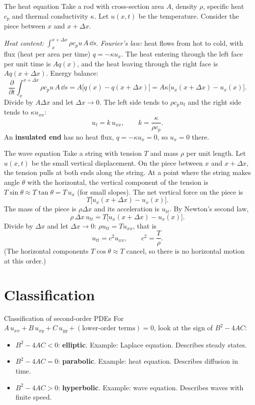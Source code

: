 \begin{derivbox}{The heat equation}
Take a rod with cross-section area $A$, density $\rho$, specific heat $c_p$ and thermal conductivity $\kappa$. Let $u(x,t)$ be the temperature. Consider the piece between $x$ and $x+\Delta x$.

\emph{Heat content:} $\int_x^{x+\Delta x}\rho c_pu\,A\,\dd s$. \emph{Fourier's law:} heat flows from hot to cold, with flux (heat per area per time) $q = -\kappa u_x$. The heat entering through the left face per unit time is $Aq(x)$, and the heat leaving through the right face is $Aq(x+\Delta x)$. Energy balance:
\[ \frac{\partial}{\partial t}\int_x^{x+\Delta x}\rho c_pu\,A\,\dd s = A\big[q(x) - q(x+\Delta x)\big] = A\kappa\big[u_x(x+\Delta x) - u_x(x)\big]. \]
Divide by $A\Delta x$ and let $\Delta x\to0$. The left side tends to $\rho c_pu_t$ and the right side tends to $\kappa u_{xx}$:
\[ u_t = k\,u_{xx},\qquad k = \frac{\kappa}{\rho c_p}. \]
An \textbf{insulated end} has no heat flux, $q = -\kappa u_x = 0$, so $u_x = 0$ there.
\end{derivbox}

\begin{derivbox}{The wave equation}
Take a string with tension $T$ and mass $\rho$ per unit length. Let $u(x,t)$ be the small vertical displacement. On the piece between $x$ and $x+\Delta x$, the tension pulls at both ends along the string. At a point where the string makes angle $\theta$ with the horizontal, the vertical component of the tension is $T\sin\theta\approx T\tan\theta = T\,u_x$ (for small slopes). The net vertical force on the piece is
\[ T\big[u_x(x+\Delta x) - u_x(x)\big]. \]
The mass of the piece is $\rho\Delta x$ and its acceleration is $u_{tt}$. By Newton's second law,
\[ \rho\,\Delta x\,u_{tt} = T\big[u_x(x+\Delta x) - u_x(x)\big]. \]
Divide by $\Delta x$ and let $\Delta x\to0$: $\rho u_{tt} = Tu_{xx}$, that is
\[ u_{tt} = c^2u_{xx},\qquad c^2 = \frac T\rho . \]
(The horizontal components $T\cos\theta\approx T$ cancel, so there is no horizontal motion at this order.)
\end{derivbox}

\section{Classification}

\begin{defbox}{Classification of second-order PDEs}
For $A\,u_{xx} + B\,u_{xy} + C\,u_{yy} + (\text{lower-order terms}) = 0$, look at the sign of $B^2 - 4AC$:
\begin{itemize}
  \item $B^2 - 4AC < 0$: \textbf{elliptic}. Example: Laplace equation. Describes steady states.
  \item $B^2 - 4AC = 0$: \textbf{parabolic}. Example: heat equation. Describes diffusion in time.
  \item $B^2 - 4AC > 0$: \textbf{hyperbolic}. Example: wave equation. Describes waves with finite speed.
\end{itemize}
\end{defbox}

